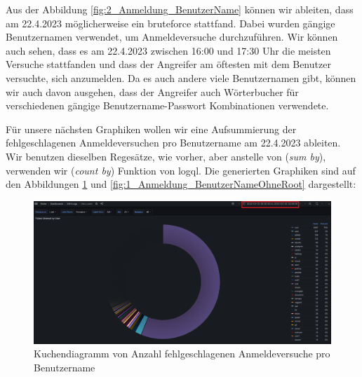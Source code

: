 Aus der Abbildung \ref{fig:2_Anmeldung_BenutzerName} können wir ableiten, dass am 22.4.2023 möglicherweise ein \gls{bruteforce} stattfand. Dabei wurden gängige Benutzernamen verwendet, um Anmeldeversuche durchzuführen. Wir können auch sehen, dass es am 22.4.2023 zwischen 16:00 und 17:30 Uhr die meisten Versuche stattfanden und dass der Angreifer am öftesten mit dem Benutzer  versuchte, sich anzumelden. Da es auch andere viele Benutzernamen gibt, können wir auch davon ausgehen, dass der Angreifer auch Wörterbucher für verschiedenen gängige Benutzername-Passwort Kombinationen verwendete.


Für unsere nächsten Graphiken wollen wir eine Aufsummierung der  fehlgeschlagenen Anmeldeversuchen pro Benutzername am 22.4.2023 ableiten. Wir benutzen dieselben Regesätze, wie vorher, aber anstelle von (\textit{sum by}), verwenden wir (\textit{count by}) Funktion von \gls{logql}. Die generierten Graphiken sind auf den Abbildungen \ref{fig:1_Anmeldung_BenutzerName} und \ref{fig:1_Anmeldung_BenutzerNameOhneRoot} dargestellt:

\newpage
{}
\thispagestyle{lscape}
\begin{landscape}
    \begin{figure}[H]
        \centerline{\includegraphics[width=1.7\textwidth]{assets/Failed_pro_user.png}}
        \caption[Kuchendiagramm von Anzahl fehlgeschlagenen Anmeldeversuche pro Benutzername]
        {Kuchendiagramm von Anzahl fehlgeschlagenen Anmeldeversuche pro Benutzername}
        \label{fig:1_Anmeldung_BenutzerName}
        \centering
    \end{figure}
\end{landscape}
\restoregeometry

